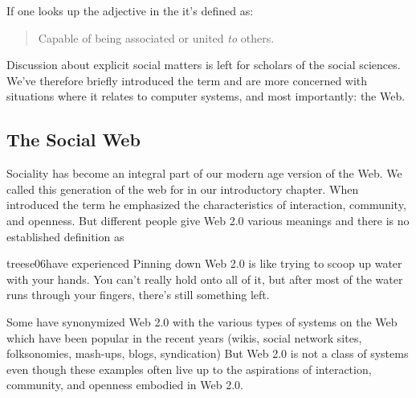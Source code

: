 If one looks up the adjective  in the
\citep[, ]{simpson89} it's defined as:

\begin{quote}
  Capable of being associated or united \emph{to} others.
\end{quote}

Discussion about explicit social matters is left for scholars of the social
sciences. We've therefore briefly introduced the term and are more concerned
with situations where it relates to computer systems, and most importantly:
the Web.

\subsection{The Social Web}
\label{section:social.navigation.sociality.the.social.web}

Sociality has become an integral part of our modern age version of the Web.
We called this generation of the web for %
in our introductory chapter. When \citet{oreilly05} introduced the term he
emphasized the characteristics of interaction, community, and openness.
But different people give Web 2.0 various meanings and there is no
established definition as
\begin{fullquote}[\p{15}]{treese06}{have experienced}
  Pinning down Web 2.0 is like trying to scoop up water with your hands. You
  can't really hold onto all of it, but after most of the water runs through
  your fingers, there's still something left.
\end{fullquote}

Some have synonymized Web 2.0 with the various types of systems on the
Web which have been popular in the recent years
(wikis, social network sites, folksonomies, mash-ups, blogs, syndication)
But Web 2.0 is not a class of systems \citep[]{millard06} even though
these examples often live up to the aspirations of interaction, community,
and openness embodied in Web 2.0.

